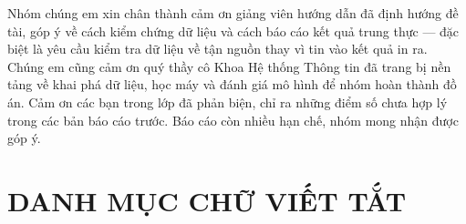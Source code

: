 \documentclass[13pt,a4paper]{extreport}
\begin{document}

Nhóm chúng em xin chân thành cảm ơn giảng viên hướng dẫn đã định hướng đề tài, góp ý về cách kiểm chứng dữ liệu và cách báo cáo kết quả trung thực — đặc biệt là yêu cầu kiểm tra dữ liệu về tận nguồn thay vì tin vào kết quả in ra. Chúng em cũng cảm ơn quý thầy cô Khoa Hệ thống Thông tin đã trang bị nền tảng về khai phá dữ liệu, học máy và đánh giá mô hình để nhóm hoàn thành đồ án. Cảm ơn các bạn trong lớp đã phản biện, chỉ ra những điểm số chưa hợp lý trong các bản báo cáo trước. Báo cáo còn nhiều hạn chế, nhóm mong nhận được góp ý.

\clearpage

\tableofcontents

\clearpage

\chapter*{DANH MỤC CHỮ VIẾT TẮT}

\end{document}
